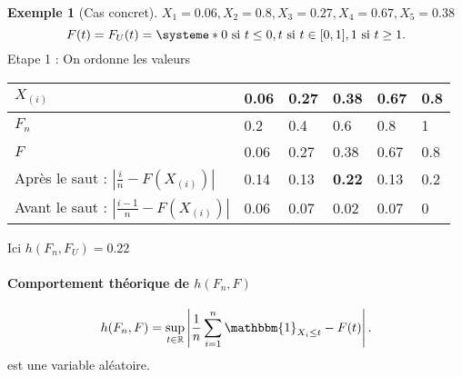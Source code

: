 \documentclass{article}
\theoremstyle{plain}%
\theoremstyle{definition}
\newtheorem{exmp}{Exemple}[section]
\theoremstyle{remark}
\begin{document}
\begin{exmp}[Cas concret]
    $ X_1 = 0.06, X_2 = 0.8, X_3 = 0.27, X_4 = 0.67, X_5 = 0.38 $ 
    \[
        F(t) = F_U(t) = \systeme*{
            0 \text{ si } t \leq 0,
            t \text{ si } t \in [0,1],
            1 \text{ si } t \geq 1
        }
    .\]
    Etape 1 : On ordonne les valeurs
    \begin{table}[!ht]
        \centering
        \begin{tabular}{|l|l|l|l|l|l|}
        \hline
            $X_{(i)}$ & 0.06 & 0.27 & 0.38 & 0.67 & 0.8 \\ \hline
            $F_n$ & 0.2 & 0.4 & 0.6 & 0.8 & 1 \\ \hline
            $F$ & 0.06 & 0.27 & 0.38 & 0.67 & 0.8 \\ \hline
            Après le saut : $\left| \frac{i}{n} - F(X_{(i)}) \right|$ & 0.14 & 0.13 & \textbf{0.22} & 0.13 & 0.2 \\ \hline
            Avant le saut : $\left| \frac{i-1}{n}- F(X_{(i)}) \right|$ & 0.06 & 0.07 & 0.02 & 0.07 & 0 \\ \hline
        \end{tabular}
        \label{tab1}
    \end{table}
    Ici $ h(F_n,F_U) = 0.22 $ 
\end{exmp}

\paragraph{Comportement théorique de $ h(F_n,F) $}

\[
    h(F_n, F) = \sup _{t \in \mathbb{R}} \left| \frac{1}{n}\sum_{i=1}^{n}\mathbbm{1}_{X_i \leq t} - F(t)  \right| 
.\]
est une variable aléatoire. 
\end{document}

